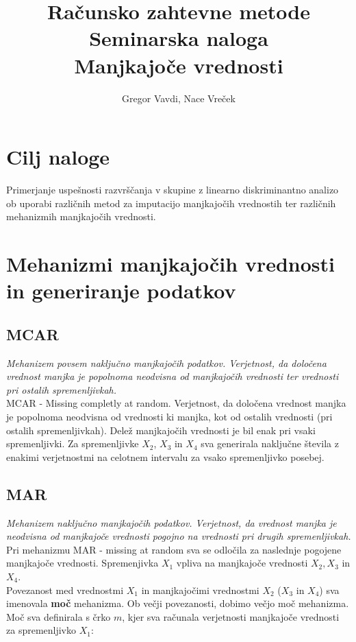 \documentclass[12pt,a4paper]{article}
\author{Gregor Vavdi, Nace Vreček}
\title{Računsko zahtevne metode \\
\large{Seminarska naloga\\
Manjkajoče vrednosti}}
\begin{document}
	\maketitle
	\pagebreak
	\tableofcontents


\newpage
\section{Cilj naloge}
Primerjanje uspešnosti razvrščanja v skupine z linearno diskriminantno analizo ob uporabi različnih metod za imputacijo manjkajočih vrednostih ter različnih mehanizmih manjkajočih vrednosti.


\section{Mehanizmi manjkajočih vrednosti in generiranje podatkov}

\subsection{MCAR}
\textit{Mehanizem povsem naključno manjkajočih podatkov. Verjetnost, da določena vrednost manjka je popolnoma neodvisna od manjkajočih vrednosti ter vrednosti pri ostalih spremenljivkah.}
\\

\noindent MCAR - Missing completly at random. Verjetnost, da določena vrednost manjka je popolnoma neodvisna od vrednosti ki manjka, kot od ostalih vrednosti (pri ostalih spremenljivkah). Delež manjkajočih vrednosti je bil enak pri vsaki spremenljivki. Za spremenljivke $X_2$, $X_3$ in $X_4$ sva generirala naključne števila z enakimi verjetnostmi na celotnem intervalu za vsako spremenljivko posebej.



\subsection{MAR}
\textit{Mehanizem naključno manjkajočih podatkov. Verjetnost, da vrednost manjka je neodvisna od manjkajoče vrednosti pogojno na vrednosti pri drugih spremenljivkah.}
\\

\noindent Pri mehanizmu MAR - missing at random sva se odločila za naslednje pogojene manjkajoče vrednosti. Spremenjivka $X_1$ vpliva na manjkajoče vrednosti $X_2, X_3$ in $X_4$.
\\
\noindent Povezanost med vrednostmi $X_1$ in manjkajočimi vrednostmi $X_2$ ($X_3$ in $X_4$) sva imenovala \textbf{moč} mehanizma. Ob večji povezanosti, dobimo večjo moč mehanizma. Moč sva definirala s črko $m$, kjer sva računala verjetnosti manjkajoče vrednosti za spremenljivko $X_1$:
\end{document}
